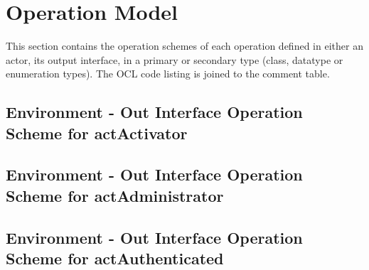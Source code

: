 \chapter{Operation Model}
\label{chap:lu.uni.lassy.excalibur.examples.icrash-OM}

This section contains the operation schemes of each operation defined in either an actor, its output interface, in a primary or secondary type (class, datatype or enumeration types). 
The \msrmessir OCL code listing is joined to the comment table.

\lstset{
float,
basicstyle=\scriptsize,
language=Messir,
breakatwhitespace=false,
tabsize=2,
breaklines=true,
numbers=left,
emptylines=1,
numbersep=5pt,
showspaces=false,
showstringspaces=false,
showtabs=false
} 



		
\section{Environment - Out Interface Operation Scheme for actActivator}
\label{OM-EM-OutInterface-OS-actActivator}


\section{Environment - Out Interface Operation Scheme for actAdministrator}
\label{OM-EM-OutInterface-OS-actAdministrator}


\section{Environment - Out Interface Operation Scheme for actAuthenticated}
\label{OM-EM-OutInterface-OS-actAuthenticated}




